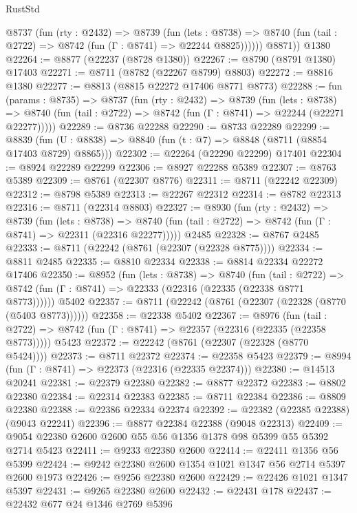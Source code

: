 \begin{lexlean}{RustStd}
\begin{coremodule}
          @8737
            (fun (rty : @2432) =>
            @8739
              (fun (lets : @8738) =>
              @8740 (fun (tail : @2722) => @8742 (fun (Γ : @8741) => @22244 @8825))))))
        @8871))
    @1380
@22264 := @8877 (@22237 (@8728 @1380))
@22267 := @8790 (@8791 @1380) @17403
@22271 := @8711 (@8782 (@22267 @8799) @8803)
@22272 := @8816 @1380
@22277 := @8813 (@8815 @22272 @17406 @8771 @8773)
@22288 := fun (params : @8735) =>
  @8737
    (fun (rty : @2432) =>
    @8739
      (fun (lets : @8738) =>
      @8740 (fun (tail : @2722) => @8742 (fun (Γ : @8741) => @22244 (@22271 @22277)))))
@22289 := @8736 @22288
@22290 := @8733 @22289
@22299 := @8839
    (fun (U : @8838) => @8840 (fun (t : @7) => @8848 (@8711 (@8854 @17403 @8729) @8865)))
@22302 := @22264 (@22290 @22299) @17401
@22304 := @8924 @22289 @22299
@22306 := @8927 @22288 @5389
@22307 := @8763 @5389
@22309 := @8761 (@22307 @8776)
@22311 := @8711 (@22242 @22309)
@22312 := @8798 @5389
@22313 := @22267 @22312
@22314 := @8782 @22313
@22316 := @8711 (@22314 @8803)
@22327 := @8930
    (fun (rty : @2432) =>
    @8739
      (fun (lets : @8738) =>
      @8740 (fun (tail : @2722) => @8742 (fun (Γ : @8741) => @22311 (@22316 @22277)))))
    @2485
@22328 := @8767 @2485
@22333 := @8711 (@22242 (@8761 (@22307 (@22328 @8775))))
@22334 := @8811 @2485
@22335 := @8810 @22334
@22338 := @8814 @22334 @22272 @17406
@22350 := @8952
    (fun (lets : @8738) =>
    @8740
      (fun (tail : @2722) =>
      @8742 (fun (Γ : @8741) => @22333 (@22316 (@22335 (@22338 @8771 @8773))))))
    @5402
@22357 := @8711 (@22242 (@8761 (@22307 (@22328 (@8770 (@5403 @8773))))))
@22358 := @22338 @5402
@22367 := @8976
    (fun (tail : @2722) => @8742 (fun (Γ : @8741) => @22357 (@22316 (@22335 (@22358 @8773)))))
    @5423
@22372 := @22242 (@8761 (@22307 (@22328 (@8770 @5424))))
@22373 := @8711 @22372
@22374 := @22358 @5423
@22379 := @8994 (fun (Γ : @8741) => @22373 (@22316 (@22335 @22374)))
@22380 := @14513 @20241
@22381 := @22379 @22380
@22382 := @8877 @22372
@22383 := @8802 @22380
@22384 := @22314 @22383
@22385 := @8711 @22384
@22386 := @8809 @22380
@22388 := @22386 @22334 @22374
@22392 := @22382 (@22385 @22388) (@9043 @22241)
@22396 := @8877 @22384 @22388 (@9048 @22313)
@22409 := @9054 @22380 @2600 @2600 @55 @56 @1356 @1378 @98 @5399 @55 @5392 @2714 @5423
@22411 := @9233 @22380 @2600
@22414 := @22411 @1356 @56 @5399
@22424 := @9242 @22380 @2600 @1354 @1021 @1347 @56 @2714 @5397 @2600 @1973
@22426 := @9256 @22380 @2600
@22429 := @22426 @1021 @1347 @5397
@22431 := @9265 @22380 @2600
@22432 := @22431 @178
@22437 := @22432 @677 @24 @1346 @2769 @5396

\end{coremodule}
\end{lexlean}
